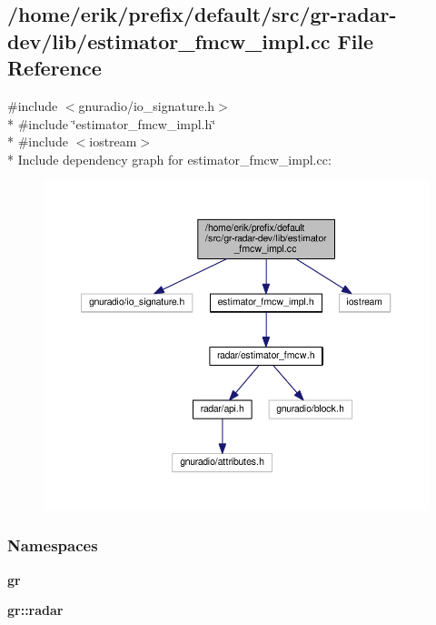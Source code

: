 \subsection{/home/erik/prefix/default/src/gr-\/radar-\/dev/lib/estimator\+\_\+fmcw\+\_\+impl.cc File Reference}
\label{estimator__fmcw__impl_8cc}
{\ttfamily \#include $<$gnuradio/io\+\_\+signature.\+h$>$}\\*
{\ttfamily \#include \char`\"{}estimator\+\_\+fmcw\+\_\+impl.\+h\char`\"{}}\\*
{\ttfamily \#include $<$iostream$>$}\\*
Include dependency graph for estimator\+\_\+fmcw\+\_\+impl.\+cc\+:
\nopagebreak
\begin{figure}[H]
\begin{center}
\leavevmode
\includegraphics[width=350pt]{d6/d85/estimator__fmcw__impl_8cc__incl}
\end{center}
\end{figure}
\subsubsection*{Namespaces}
\begin{DoxyCompactItemize}
\item 
 {\bf gr}
\item 
 {\bf gr\+::radar}
\end{DoxyCompactItemize}

